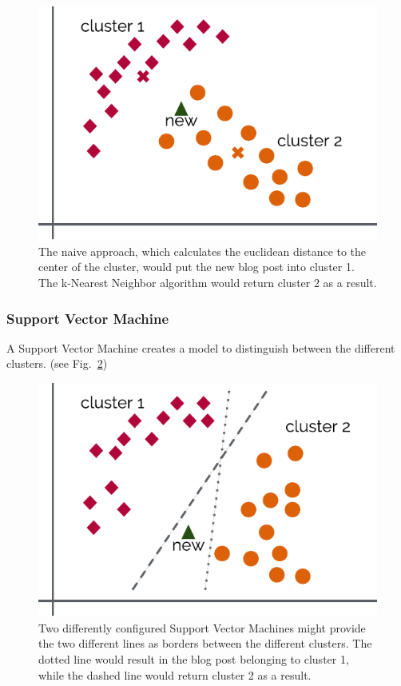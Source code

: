 \begin{figure}
    \centering
    \includegraphics[]{images/naive.pdf}
    \caption{The naive approach, which calculates the euclidean distance to the center of the cluster, would put the new blog post into cluster 1. The k-Nearest Neighbor algorithm would return cluster 2 as a result.}
    \label{fig:naive}
\end{figure}


\subsubsection{Support Vector Machine}
\label{sec:support_vector_machine}


A Support Vector Machine creates a model to distinguish between the different clusters.
(see Fig.~\ref{fig:svm})


\begin{figure}
    \centering
    \includegraphics[]{images/svm.pdf}
    \caption{Two differently configured Support Vector Machines might provide the two different lines as borders between the different clusters. The dotted line would result in the blog post belonging to cluster 1, while the dashed line would return cluster 2 as a result.}
    \label{fig:svm}
\end{figure}
